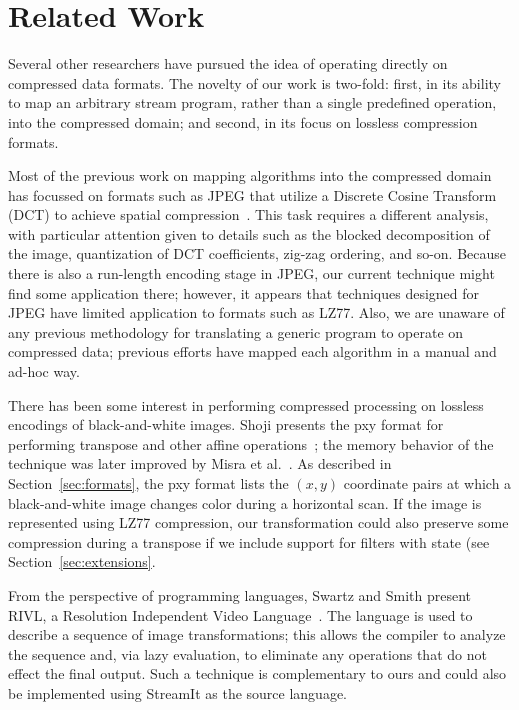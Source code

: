 \section{Related Work}
\label{sec:related}

Several other researchers have pursued the idea of operating directly
on compressed data formats.  The novelty of our work is two-fold:
first, in its ability to map an arbitrary stream program, rather than
a single predefined operation, into the compressed domain; and second,
in its focus on lossless compression formats.

Most of the previous work on mapping algorithms into the compressed
domain has focussed on formats such as JPEG that utilize a Discrete
Cosine Transform (DCT) to achieve spatial
compression~\cite{smith98,dorai00,dugad01,feng03,mukherjee02,nang00,shen96,shen96b,shen98,smith96b,vasudev98}.
This task requires a different analysis, with particular attention
given to details such as the blocked decomposition of the image,
quantization of DCT coefficients, zig-zag ordering, and so-on.
Because there is also a run-length encoding stage in JPEG, our current
technique might find some application there; however, it appears that
techniques designed for JPEG have limited application to formats such
as LZ77.  Also, we are unaware of any previous methodology for
translating a generic program to operate on compressed data; previous
efforts have mapped each algorithm in a manual and ad-hoc way.

There has been some interest in performing compressed processing on
lossless encodings of black-and-white images.  Shoji presents the pxy
format for performing transpose and other affine
operations~\cite{shoji95}; the memory behavior of the technique was
later improved by Misra et al.~\cite{misra99}.  As described
in Section~\ref{sec:formats}, the pxy format lists the $(x,y)$
coordinate pairs at which a black-and-white image changes color during
a horizontal scan.  If the image is represented using LZ77
compression, our transformation could also preserve some compression
during a transpose if we include support for filters with state (see
Section~\ref{sec:extensions}.

From the perspective of programming languages, Swartz and Smith
present RIVL, a Resolution Independent Video
Language~\cite{swartz95}.  The language is used to describe
a sequence of image transformations; this allows the compiler to
analyze the sequence and, via lazy evaluation, to eliminate any
operations that do not effect the final output.  Such a technique is
complementary to ours and could also be implemented using StreamIt as
the source language.
